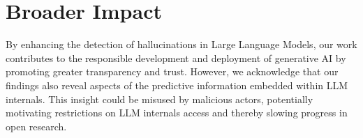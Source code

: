 \section{Broader Impact}

By enhancing the detection of hallucinations in Large Language Models, our work contributes to the
responsible development and deployment of generative AI by promoting greater transparency and
trust. However, we acknowledge that our findings also reveal aspects of the predictive information
embedded within LLM internals. This insight could be misused by malicious actors, potentially
motivating restrictions on LLM internals access and thereby slowing progress in open research.
